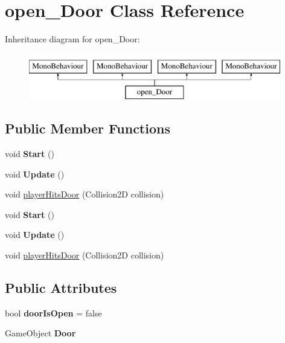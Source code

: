 \hypertarget{classopen___door}{}\section{open\+\_\+\+Door Class Reference}
\label{classopen___door}
Inheritance diagram for open\+\_\+\+Door\+:\begin{figure}[H]
\begin{center}
\leavevmode
\includegraphics[height=2.000000cm]{classopen___door}
\end{center}
\end{figure}
\subsection*{Public Member Functions}
\begin{DoxyCompactItemize}
\item 
\mbox{\label{classopen___door_a73d16144fb87c086186bd5c26b5919a5}} 
void {\bfseries Start} ()
\item 
\mbox{\label{classopen___door_a7689f551c5c3a63718e506e6e101c36f}} 
void {\bfseries Update} ()
\item 
void \mbox{\hyperlink{classopen___door_af445b9df0f862ee2c2d667d6b1f92811}{player\+Hits\+Door}} (Collision2D collision)
\item 
\mbox{\label{classopen___door_a73d16144fb87c086186bd5c26b5919a5}} 
void {\bfseries Start} ()
\item 
\mbox{\label{classopen___door_a7689f551c5c3a63718e506e6e101c36f}} 
void {\bfseries Update} ()
\item 
void \mbox{\hyperlink{classopen___door_af445b9df0f862ee2c2d667d6b1f92811}{player\+Hits\+Door}} (Collision2D collision)
\end{DoxyCompactItemize}
\subsection*{Public Attributes}
\begin{DoxyCompactItemize}
\item 
\mbox{\label{classopen___door_a34629462a4381ae1d7a19541441fafcb}} 
bool {\bfseries door\+Is\+Open} = false
\item 
\mbox{\label{classopen___door_a7fb721baa152def598139ec092c922ce}} 
Game\+Object {\bfseries Door}
\end{DoxyCompactItemize}



